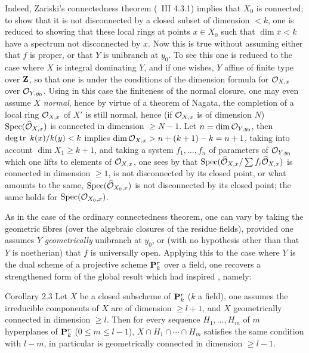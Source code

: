 Indeed, Zariski's connectedness theorem (\cf\ \EGA III 4.3.1) implies that $X_0$ is connected; to show that it is not disconnected by a closed subset of dimension $<k$, one is reduced to showing that these local rings at points $x\in X_0$ such that $\dim \overline{x}<k$ have a spectrum not disconnected by $x$. Now this is true without assuming either that $f$ is proper, or that $Y$ is unibranch at $y_0$. To see this one is reduced to the case where $X$ is integral dominating $Y$, and if one wishes, $Y$ affine of finite type over $\mathbf{Z}$, so that one is under the conditions of the dimension formula for ${\mathcal O}_{X, x}$ over ${\mathcal O}_{Y, y_0}$. Using in this case the finiteness of the normal closure, one may even assume $X$ \emph{normal}, hence by virtue of a theorem of Nagata, the completion of a local ring ${\mathcal O}_{X, x}$ of $X'$ is still normal, hence (if ${\mathcal O}_{X, x}$ is of dimension $N$) $\operatorname{Spec} (\widehat{{\mathcal O}}_{X, x})$ is connected in dimension $\ge N-1$. Let $n=\dim{\mathcal O}_{Y, y_0}$, then $\operatorname{deg\,tr}~k(x)/k(y)<k$ implies $\dim {\mathcal O}_{X, x}>n+(k+1)-k=n+1$, taking into account $\dim X_1\ge k+1$, and taking a system $f_1, \dotsc, f_n$ of parameters of ${\mathcal O}_{Y, y_0}$ which one lifts to elements of ${\mathcal O}_{X, x}$, one sees by  that $\operatorname{Spec} (\widehat{{\mathcal O}}_{X, x}/\sum f_i\widehat{{\mathcal O}}_{X, x})$ is connected in dimension $\ge 1$, \ie is not disconnected by its closed point, or what amounts to the same, $\operatorname{Spec}(\widehat{{\mathcal O}}_{X_0, x})$ is not disconnected by its closed point; \afortiori the same holds for $\operatorname{Spec} ({\mathcal O}_{X_0, x})$.

As in the case of the ordinary connectedness theorem, one can vary  by taking the geometric fibres (over the algebraic closures of the residue fields), provided one assumes $Y$ \emph{geometrically} unibranch at $y_0$, or (with no hypothesis other than that $Y$ is noetherian) that $f$ is universally open. Applying this to the case where $Y$ is the dual scheme of a projective scheme ${\mathbf P}_k^r$ over a field, one recovers a strengthened form of the global result which had inspired , namely:

\label{XIII.2.3}
\begin{enonce*}{Corollary 2.3\ndemark}
Let $X$ be a closed subscheme of ${\mathbf P}^r_k$ ($k$ a field), one assumes the irreducible components of $X$ are of dimension $\ge l+1$, and $X$ geometrically connected in dimension $\ge l$. Then for every sequence $H_1, \dotsc, H_m$ of $m$ hyperplanes of ${\mathbf P}^r_k$ ($0\le m\le l-1$), $X\cap H_1\cap \dotsb \cap H_m$ satisfies the same condition with $l-m$, in particular is geometrically connected in dimension $\ge l-1$.
\end{enonce*}

